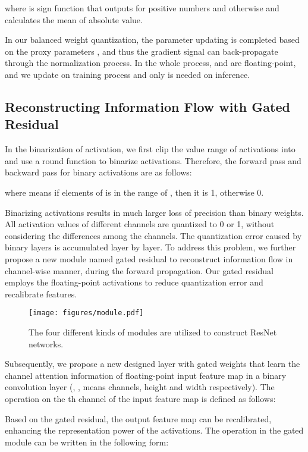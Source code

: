 \documentclass{article}
\begin{document}
where  is sign function that outputs  for positive numbers and  otherwise and  calculates the mean of absolute value.

In our balanced weight quantization, the parameter updating is completed based on the proxy parameters , and thus the gradient signal can back-propagate through the normalization process. In the whole process,  and  are floating-point, and we update  on training process and only  is needed on inference. 

\subsection{Reconstructing Information Flow with Gated Residual}	
In the binarization of activation, we first clip the value range of activations  into  and use a round function to binarize activations. Therefore, the forward pass and backward pass for binary activations are as follows:

where  means if elements of  is in the range of , then it is 1, otherwise 0.

Binarizing activations results in much larger loss of precision than binary weights. All activation values of different channels are quantized to 0 or 1, without considering the differences among the channels. The quantization error caused by binary layers is accumulated layer by layer. To address this problem, we further propose a new module named gated residual to reconstruct information flow in channel-wise manner, during the forward propagation. Our gated residual employs the floating-point activations to reduce quantization error and recalibrate features.
\begin{figure}
	\centering
	\small
\texttt{[image: figures/module.pdf]}
	\vspace{-0.2in}
	\caption{The four different kinds of modules are utilized to construct ResNet networks.}
	\label{module}
	\vspace{-0.2in}
\end{figure}

Subsequently, we propose a new designed layer with gated weights  that learn the channel attention information of floating-point input feature map  in a binary convolution layer (, ,  means channels, height and width respectively). The operation on the th channel of the input feature map  is defined as follows:	

Based on the gated residual, the output feature map  can be recalibrated, enhancing the representation power of the activations. The operation in the gated module can be written in the following form:
	
\end{document}
